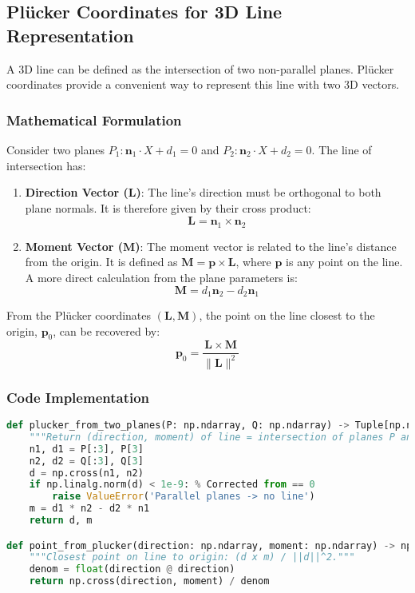 \documentclass{article}
\begin{document}
\subsection{Pl\"ucker Coordinates for 3D Line Representation}
A 3D line can be defined as the intersection of two non-parallel planes. Pl\"ucker coordinates provide a convenient way to represent this line with two 3D vectors.

\subsubsection{Mathematical Formulation}
Consider two planes $P_1: \mathbf{n}_1 \cdot X + d_1 = 0$ and $P_2: \mathbf{n}_2 \cdot X + d_2 = 0$. The line of intersection has:
\begin{enumerate}
    \item \textbf{Direction Vector ($\mathbf{L}$)}: The line's direction must be orthogonal to both plane normals. It is therefore given by their cross product:
    \begin{equation}
    \mathbf{L} = \mathbf{n}_1 \times \mathbf{n}_2
    \end{equation}
    \item \textbf{Moment Vector ($\mathbf{M}$)}: The moment vector is related to the line's distance from the origin. It is defined as $\mathbf{M} = \mathbf{p} \times \mathbf{L}$, where $\mathbf{p}$ is any point on the line. A more direct calculation from the plane parameters is:
    \begin{equation}
    \mathbf{M} = d_1 \mathbf{n}_2 - d_2 \mathbf{n}_1
    \end{equation}
\end{enumerate}
From the Pl\"ucker coordinates $(\mathbf{L}, \mathbf{M})$, the point on the line closest to the origin, $\mathbf{p}_0$, can be recovered by:
\begin{equation}
\mathbf{p}_0 = \frac{\mathbf{L} \times \mathbf{M}}{\|\mathbf{L}\|^2}
\end{equation}

\subsubsection{Code Implementation}
\begin{lstlisting}[language=Python]
def plucker_from_two_planes(P: np.ndarray, Q: np.ndarray) -> Tuple[np.ndarray, np.ndarray]:
    """Return (direction, moment) of line = intersection of planes P and Q."""
    n1, d1 = P[:3], P[3]
    n2, d2 = Q[:3], Q[3]
    d = np.cross(n1, n2)
    if np.linalg.norm(d) < 1e-9: % Corrected from == 0
        raise ValueError('Parallel planes -> no line')
    m = d1 * n2 - d2 * n1
    return d, m

def point_from_plucker(direction: np.ndarray, moment: np.ndarray) -> np.ndarray:
    """Closest point on line to origin: (d x m) / ||d||^2."""
    denom = float(direction @ direction)
    return np.cross(direction, moment) / denom
\end{lstlisting}
\end{document}
